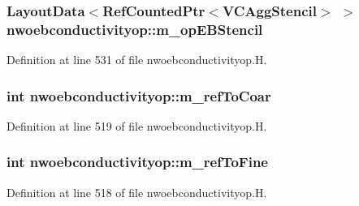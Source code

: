 \subsubsection[{\texorpdfstring{m\+\_\+op\+E\+B\+Stencil}{m_opEBStencil}}]{\setlength{\rightskip}{0pt plus 5cm}Layout\+Data$<$Ref\+Counted\+Ptr$<$V\+C\+Agg\+Stencil$>$ $>$ nwoebconductivityop\+::m\+\_\+op\+E\+B\+Stencil\hspace{0.3cm}{\ttfamily [protected]}}\hypertarget{classnwoebconductivityop_a9996cd31c4a2de9fac89e92ac4c1a1be}{}\label{classnwoebconductivityop_a9996cd31c4a2de9fac89e92ac4c1a1be}


Definition at line 531 of file nwoebconductivityop.\+H.

\subsubsection[{\texorpdfstring{m\+\_\+ref\+To\+Coar}{m_refToCoar}}]{\setlength{\rightskip}{0pt plus 5cm}int nwoebconductivityop\+::m\+\_\+ref\+To\+Coar\hspace{0.3cm}{\ttfamily [protected]}}\hypertarget{classnwoebconductivityop_a02233906ad24577bb7e4328ee05be990}{}\label{classnwoebconductivityop_a02233906ad24577bb7e4328ee05be990}


Definition at line 519 of file nwoebconductivityop.\+H.

\subsubsection[{\texorpdfstring{m\+\_\+ref\+To\+Fine}{m_refToFine}}]{\setlength{\rightskip}{0pt plus 5cm}int nwoebconductivityop\+::m\+\_\+ref\+To\+Fine\hspace{0.3cm}{\ttfamily [protected]}}\hypertarget{classnwoebconductivityop_a40ac1af5245c6e78de1cacf2a6285726}{}\label{classnwoebconductivityop_a40ac1af5245c6e78de1cacf2a6285726}


Definition at line 518 of file nwoebconductivityop.\+H.

